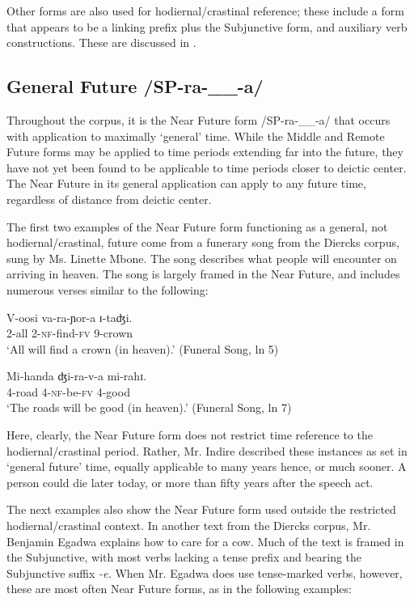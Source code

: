 \documentclass[output=paper]{langsci/langscibook}
\begin{document}
Other forms are also used for hodiernal/crastinal reference; these include a form that appears to be a linking prefix plus the Subjunctive form, and auxiliary verb constructions. These are discussed in .

\subsection{General Future /SP-ra-\_\_-a/}
\label{sec:sarvasy:3.2}

Throughout the corpus, it is the Near Future form /SP-ra-\_\_-a/ that occurs with application to maximally ‘general’ time. While the Middle and Remote Future forms may be applied to time periods extending far into the future, they have not yet been found to be applicable to time periods closer to deictic center. The Near Future in its general application can apply to any future time, regardless of distance from deictic center. 

The first two examples of the Near Future form functioning as a general, not hodiernal/crastinal, future come from a funerary song from the Diercks corpus, sung by Ms. Linette Mbone. The song describes what people will encounter on arriving in heaven. The song is largely framed in the Near Future, and includes numerous verses similar to the following:

\ea\label{ex:sarvasy:2}
\gll V-oosi   va-ra-ɲor-a     ɪ{}-taʤi. \\
2-all 2-\textsc{nf}{}-find-\textsc{fv}    9-crown \\
\glt ‘All will find a crown (in heaven).’ (Funeral Song, ln 5)
\z

\ea\label{ex:sarvasy:3}
\gll Mi-handa   ʤi-ra-v-a   mi-rahɪ. \\
4-road 4-\textsc{nf}{}-be-\textsc{fv} 4-good \\
\glt ‘The roads will be good (in heaven).’ (Funeral Song, ln 7)
\z

Here, clearly, the Near Future form does not restrict time reference to the hodiernal/crastinal period. Rather, Mr. Indire described these instances as set in ‘general future’ time, equally applicable to many years hence, or much sooner. A person could die later today, or more than fifty years after the speech act.

The next examples also show the Near Future form used outside the restricted hodiernal/crastinal context. In another text from the Diercks corpus, Mr. Benjamin Egadwa explains how to care for a cow. Much of the text is framed in the Subjunctive, with most verbs lacking a tense prefix and bearing the Subjunctive suffix \textit{{}-e. }When Mr. Egadwa does use tense-marked verbs, however, these are most often Near Future forms, as in the following examples: 
\end{document}
